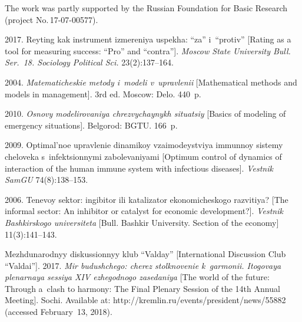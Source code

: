

\Ack
\noindent
The work was partly supported by the Russian Foundation for Basic Research (project 
No.\,17-07-00577).




  \begin{multicols}{2}

\renewcommand{\bibname}{\protect\rmfamily References}

{\small\frenchspacing
 {%
 \begin{thebibliography}{99}


 2017. 
Reyting kak instrument izmereniya uspekha: ``za'' i~``protiv'' 
[Rating as a tool for measuring success: ``Pro'' and ``contra'']. 
\textit{Moscow State University Bull. 
Ser.~18. Sociology Political Sci.} 23(2):137--164.

2004. \textit{Ma\-te\-ma\-ti\-che\-skie metody i~modeli v~upravlenii} 
[Mathematical methods and models in management]. 3rd ed.  Moscow: Delo. 440~p.

 2010. 
\textit{Osnovy modelirovaniya chrezvychaynykh situatsiy} 
[Basics of modeling of emergency situations]. Belgorod: BGTU. 166~p.

 2009. 
Optimal'noe upravlenie dinamikoy vzaimodeystviya immunnoy sistemy cheloveka 
s~infektsionnymi zabolevaniyami [Optimum control of dynamics of interaction of 
the human immune system with infectious diseases]. \textit{Vestnik SamGU}
 74(8):138--153.

 2006. Tenevoy sektor: ingibitor ili 
katalizator ekonomicheskogo razvitiya? [The informal sector: An 
inhibitor or catalyst for economic development?]. 
\textit{Vestnik Bashkirskogo universiteta} 
[Bull. Bashkir University. Section of the economy] 11(3):141--143.

 Mezhdunarodnyy diskussionnyy klub ``Valday''
[International 
 Discussion Club ``Valdai'']. 2017.
 \textit{Mir budushchego: cherez stolknovenie k~garmonii. 
Itogovaya plenarnaya sessiya XIV ezhegodnogo zasedaniya} 
 [The world of the future: Through a~clash to harmony: 
 The Final Plenary Session of the 14th Annual Meeting].  Sochi. Available at: 
 {\sf http://kremlin.ru/events/president/news/55882} (accessed February~13, 2018).


\end{thebibliography}}}
\end{multicols}

